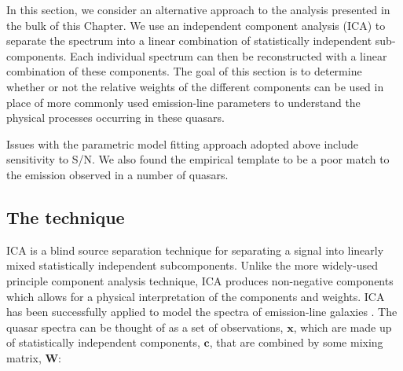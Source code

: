

In this section, we consider an alternative approach to the analysis presented in the bulk of this Chapter. 
We use an independent component analysis (ICA) to separate the spectrum into a linear combination of statistically independent sub-components. 
Each individual spectrum can then be reconstructed with a linear combination of these components. 
The goal of this section is to determine whether or not the relative weights of the different components can be used in place of more commonly used emission-line parameters to understand the physical processes occurring in these quasars. 

Issues with the parametric model fitting approach adopted above include sensitivity to S/N. 
We also found the empirical template to be a poor match to the  emission observed in a number of quasars. 

\subsection{The technique}
 
ICA is a blind source separation technique for separating a signal into linearly mixed statistically independent subcomponents. 
Unlike the more widely-used principle component analysis technique, ICA produces non-negative components which allows for a physical interpretation of the components and weights.  
ICA has been successfully applied to model the spectra of emission-line galaxies \citep{allen13}. 
The quasar spectra can be thought of as a set of observations, $\bm{x}$, which are made up of statistically independent components, $\bm{c}$, that are combined by some mixing matrix, $\bm{W}$:

